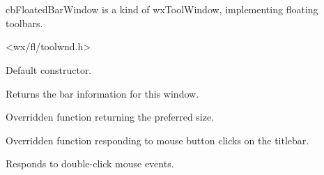 %
%


\section{}\label{cbfloatedbarwindow}


cbFloatedBarWindow is a kind of wxToolWindow,
implementing floating toolbars.




<wx/fl/toolwnd.h>




\label{cbfloatedbarwindowcbfloatedbarwindow}


Default constructor.


\label{cbfloatedbarwindowgetbar}


Returns the bar information for this window.


\label{cbfloatedbarwindowgetpreferredsize}


Overridden function returning the preferred size.


\label{cbfloatedbarwindowhandletitleclick}


Overridden function responding to mouse button clicks on the titlebar.


\label{cbfloatedbarwindowondblclick}


Responds to double-click mouse events.


\label{cbfloatedbarwindowonminibuttonclicked}

